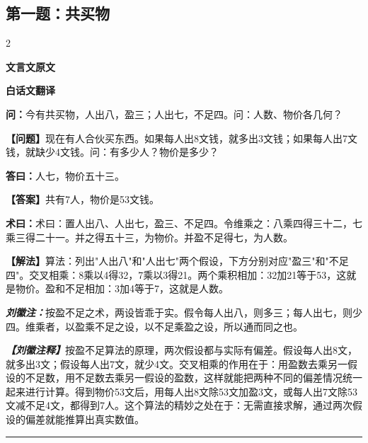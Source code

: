 \documentclass[10pt,a4paper]{article}
\newcommand{\wen}[1]{\textbf{\color{problemcolor}问：}#1\par}
\newcommand{\da}[1]{\textbf{答曰：}#1\par}
\newcommand{\shu}[1]{\textbf{术曰：}#1\par}
\newcommand{\liuhui}[1]{{\color{commentarycolor}\textit{\textbf{刘徽注：}}#1\par}}
\newcommand{\classicalheader}[1]{{\centering\large\bfseries\color{classicalcolor} #1\par\vspace{0.5em}}}
\newcommand{\wenmodern}[1]{\textbf{\color{moderncolor}【问题】}#1\par}
\newcommand{\damodern}[1]{\textbf{【答案】}#1\par}
\newcommand{\shumodern}[1]{\textbf{【解法】}#1\par}
\newcommand{\liuhuimodern}[1]{{\color{commentarycolor}\textit{\textbf{【刘徽注释】}}#1\par}}
\newcommand{\modernheader}[1]{{\centering\large\bfseries\color{moderncolor} #1\par\vspace{0.5em}}}
\newcommand{\problemsec}[1]{\subsection*{#1}}
\begin{document}
\newpage
\problemsec{第一题：共买物}
\begin{paracol}{2}
\classicalheader{文言文原文}
\switchcolumn
\modernheader{白话文翻译}
\switchcolumn*

\wen{今有共买物，人出八，盈三；人出七，不足四。问：人数、物价各几何？}

\switchcolumn

\wenmodern{现在有人合伙买东西。如果每人出8文钱，就多出3文钱；如果每人出7文钱，就缺少4文钱。问：有多少人？物价是多少？}

\switchcolumn*

\da{人七，物价五十三。}

\switchcolumn

\damodern{共有7人，物价是53文钱。}

\switchcolumn*

\shu{术曰：置人出八、人出七，盈三、不足四。令维乘之：八乘四得三十二，七乘三得二十一。并之得五十三，为物价。并盈不足得七，为人数。}

\switchcolumn

\shumodern{算法：列出"人出八"和"人出七"两个假设，下方分别对应"盈三"和"不足四"。交叉相乘：8乘以4得32，7乘以3得21。两个乘积相加：32加21等于53，这就是物价。盈和不足相加：3加4等于7，这就是人数。}

\switchcolumn*

\liuhui{按盈不足之术，两设皆乖于实。假令每人出八，则多三；每人出七，则少四。维乘者，以盈乘不足之设，以不足乘盈之设，所以通而同之也。}

\switchcolumn

\liuhuimodern{按盈不足算法的原理，两次假设都与实际有偏差。假设每人出8文，就多出3文；假设每人出7文，就少4文。交叉相乘的作用在于：用盈数去乘另一假设的不足数，用不足数去乘另一假设的盈数，这样就能把两种不同的偏差情况统一起来进行计算。得到物价53文后，用每人出8文除53文加盈3文，或每人出7文除53文减不足4文，都得到7人。这个算法的精妙之处在于：无需直接求解，通过两次假设的偏差就能推算出真实数值。}

\end{paracol}

\vspace{0.3cm}
\hrule
\vspace{0.3cm}
\end{document}
